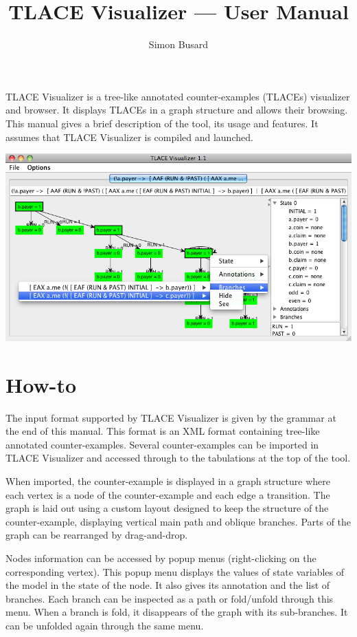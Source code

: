 \documentclass{article}
\title{TLACE Visualizer --- User Manual}
\author{Simon Busard}
\begin{document}
	\maketitle
	
	TLACE Visualizer is a tree-like annotated counter-examples (TLACEs) visualizer and browser. It displays TLACEs in a graph structure and allows their browsing.
	This manual gives a brief description of the tool, its usage and features. It assumes that TLACE Visualizer is compiled and launched.
	
	\begin{screenshot}[!ht]
		\centering
		\includegraphics[width=\textwidth]{images/Screenshot.png}
	\end{screenshot}
	
	\section*{How-to}
	
	The input format supported by TLACE Visualizer is given by the grammar at the end of this manual. This format is an XML format containing tree-like annotated counter-examples. Several counter-examples can be imported in TLACE Visualizer and accessed through to the tabulations at the top of the tool.
	
	When imported, the counter-example is displayed in a graph structure where each vertex is a node of the counter-example and each edge a transition. The graph is laid out using a custom layout designed to keep the structure of the counter-example, displaying vertical main path and oblique branches.  Parts of the graph can be rearranged by drag-and-drop.
	
	Nodes information can be accessed by popup menus (right-clicking on the corresponding vertex). This popup menu displays the values of state variables of the model in the state of the node. It also gives its annotation and the list of branches. Each branch can be inspected as a path or fold/unfold through this menu. When a branch is fold, it disappears of the graph with its sub-branches. It can be unfolded again through the same menu.
	
\end{document}
